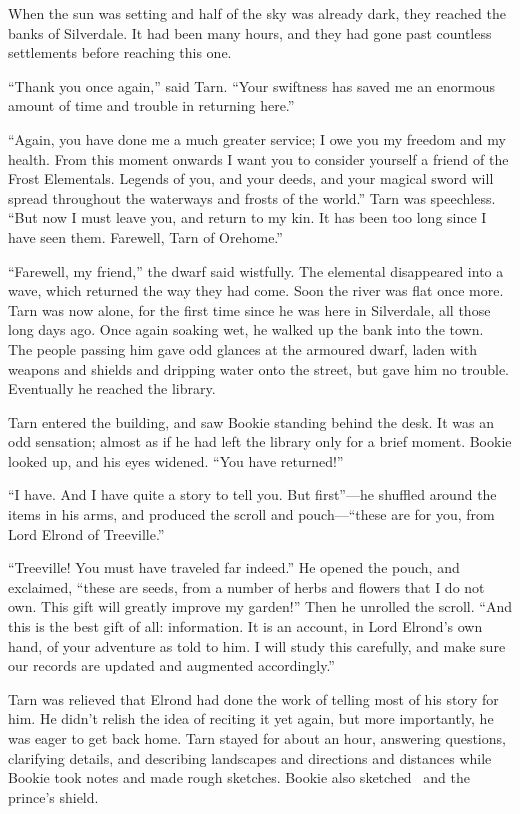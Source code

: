 When the sun was setting and half of the sky was already dark, they reached the banks of Silverdale.  It had been many hours, and they had gone past countless settlements before reaching this one.

``Thank you once again,'' said Tarn.  ``Your swiftness has saved me an enormous amount of time and trouble in returning here.''

``Again, you have done me a much greater service; I owe you my freedom and my health.  From this moment onwards I want you to consider yourself a friend of the Frost Elementals.  Legends of you, and your deeds, and your magical sword will spread throughout the waterways and frosts of the world.''  Tarn was speechless.  ``But now I must leave you, and return to my kin.  It has been too long since I have seen them.  Farewell, Tarn of Orehome.''

``Farewell, my friend,'' the dwarf said wistfully.  The elemental disappeared into a wave, which returned the way they had come.  Soon the river was flat once more.  Tarn was now alone, for the first time since he was here in Silverdale, all those long days ago.  Once again soaking wet, he walked up the bank into the town.  The people passing him gave odd glances at the armoured dwarf, laden with weapons and shields and dripping water onto the street, but gave him no trouble.  Eventually he reached the library.

Tarn entered the building, and saw Bookie standing behind the desk.  It was an odd sensation; almost as if he had left the library only for a brief moment.  Bookie looked up, and his eyes widened.  ``You have returned!''

``I have.  And I have quite a story to tell you.  But first''---he shuffled around the items in his arms, and produced the scroll and pouch---``these are for you, from Lord Elrond of Treeville.''

``Treeville!  You must have traveled far indeed.''  He opened the pouch, and exclaimed, ``these are seeds, from a number of herbs and flowers that I do not own.  This gift will greatly improve my garden!''  Then he unrolled the scroll.  ``And this is the best gift of all: information.  It is an account, in Lord Elrond's own hand, of your adventure as told to him.  I will study this carefully, and make sure our records are updated and augmented accordingly.''

Tarn was relieved that Elrond had done the work of telling most of his story for him.  He didn't relish the idea of reciting it yet again, but more importantly, he was eager to get back home.  Tarn stayed for about an hour, answering questions, clarifying details, and describing landscapes and directions and distances while Bookie took notes and made rough sketches.  Bookie also sketched \kildir\ and the prince's shield.

